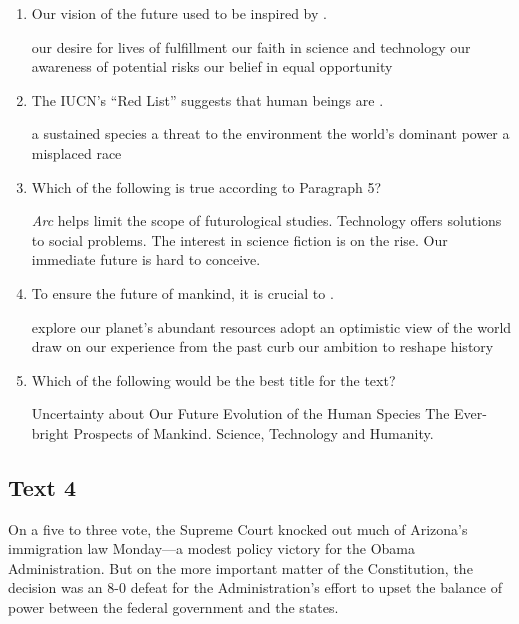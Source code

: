\begin{enumerate}[resume]
	\item
Our vision of the future used to be inspired by \lineread.


\fourchoices
{our desire for lives of fulfillment}
{our faith in science and technology}
{our awareness of potential risks}
{our belief in equal opportunity}


\item
The IUCN's ``Red List'' suggests that human beings are \lineread.


\fourchoices
{a sustained species}
{a threat to the environment}
{the world's dominant power}
{a misplaced race}



\item
Which of the following is true according to Paragraph 5?


\fourchoices
{\emph{Arc} helps limit the scope of futurological studies.}
{Technology offers solutions to social problems.}
{The interest in science fiction is on the rise.}
{Our immediate future is hard to conceive.}



\item
To ensure the future of mankind, it is crucial to \lineread.


\fourchoices
{explore our planet's abundant resources}
{adopt an optimistic view of the world}
{draw on our experience from the past}
{curb our ambition to reshape history}


\item
Which of the following would be the best title for the
text?


\fourchoices
{Uncertainty about Our Future}
{Evolution of the Human Species}
{The Ever-bright Prospects of Mankind.}
{Science, Technology and Humanity.}

\end{enumerate}



\newpage
\subsection{Text 4}


On a five to three vote, the Supreme Court knocked out much of Arizona's
immigration law Monday---a modest policy victory for the Obama
Administration. But on the more important matter of the Constitution,
the decision was an 8-0 defeat for the Administration's effort to upset
the balance of power between the federal government and the states.

